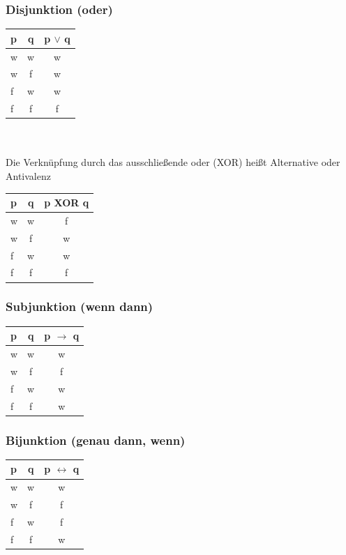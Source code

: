 \documentclass[a4paper,12pt]{scrartcl}
\begin{document}
\subsubsection{Disjunktion (oder)}
\begin{tabular}{lc|c}
  p & q & p $\vee$ q\\
  \hline
  w & w & w \\
  w & f & w \\
  f & w & w \\
  f & f & f \\
\end{tabular}
\\ 
\\ Die Verknüpfung durch das ausschließende oder (XOR) heißt Alternative oder Antivalenz \\

\begin{tabular}{lc|c}
  p & q & p XOR q\\
  \hline
  w & w & f \\
  w & f & w \\
  f & w & w \\
  f & f & f \\
\end{tabular}

\subsubsection{Subjunktion (wenn dann)}
\begin{tabular}{lc|c}
  p & q & p $\to$ q\\
  \hline
  w & w & w \\
  w & f & f \\
  f & w & w \\
  f & f & w \\
\end{tabular}

\subsubsection{Bijunktion (genau dann, wenn)}
\begin{tabular}{lc|c}
  p & q & p $\leftrightarrow$ q\\
  \hline
  w & w & w \\
  w & f & f \\
  f & w & f \\
  f & f & w \\
\end{tabular}
\end{document}
